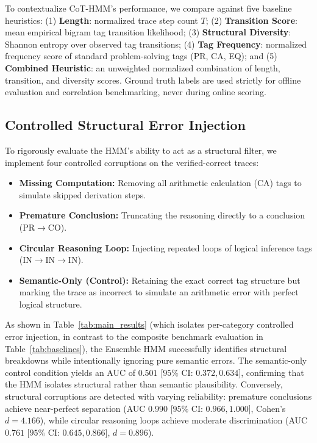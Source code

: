 \documentclass[conference]{IEEEtran}
\begin{document}
To contextualize CoT-HMM's performance, we compare against five baseline heuristics: (1) \textbf{Length}: normalized trace step count $T$; (2) \textbf{Transition Score}: mean empirical bigram tag transition likelihood; (3) \textbf{Structural Diversity}: Shannon entropy over observed tag transitions; (4) \textbf{Tag Frequency}: normalized frequency score of standard problem-solving tags (PR, CA, EQ); and (5) \textbf{Combined Heuristic}: an unweighted normalized combination of length, transition, and diversity scores. Ground truth labels are used strictly for offline evaluation and correlation benchmarking, never during online scoring.

\subsection{Controlled Structural Error Injection}

To rigorously evaluate the HMM's ability to act as a structural filter, we implement four controlled corruptions on the verified-correct traces:
\begin{itemize}
    \item \textbf{Missing Computation:} Removing all arithmetic calculation (CA) tags to simulate skipped derivation steps.
    \item \textbf{Premature Conclusion:} Truncating the reasoning directly to a conclusion (PR$\rightarrow$CO).
    \item \textbf{Circular Reasoning Loop:} Injecting repeated loops of logical inference tags (IN$\rightarrow$IN$\rightarrow$IN).
    \item \textbf{Semantic-Only (Control):} Retaining the exact correct tag structure but marking the trace as incorrect to simulate an arithmetic error with perfect logical structure.
\end{itemize}

As shown in Table~\ref{tab:main_results} (which isolates per-category controlled error injection, in contrast to the composite benchmark evaluation in Table~\ref{tab:baselines}), the Ensemble HMM successfully identifies structural breakdowns while intentionally ignoring pure semantic errors. The semantic-only control condition yields an AUC of $0.501$ [$95\%$ CI: $0.372, 0.634$], confirming that the HMM isolates structural rather than semantic plausibility. Conversely, structural corruptions are detected with varying reliability: premature conclusions achieve near-perfect separation (AUC $0.990$ [$95\%$ CI: $0.966, 1.000$], Cohen's $d = 4.166$), while circular reasoning loops achieve moderate discrimination (AUC $0.761$ [$95\%$ CI: $0.645, 0.866$], $d = 0.896$).
\end{document}
